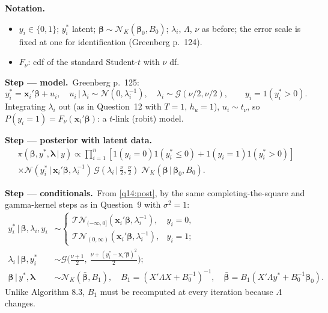 \documentclass[11pt,a4paper]{article}
\numberwithin{equation}{questao}
\newenvironment{notacao}{\par\smallskip\noindent\textbf{Notation.}\begin{itemize}[leftmargin=1.4em,topsep=1pt,itemsep=0pt]\small}{\end{itemize}}
\newcommand{\passo}[2]{\par\smallskip\noindent\textbf{Step --- #1.}~#2}
\newcommand{\TN}{\mathcal{TN}}
\newcommand{\N}{\mathcal{N}}
\newcommand{\Ga}{\mathcal{G}}
\begin{document}
\begin{sol}
\begin{notacao}
\item $y_i\in\{0,1\}$; $y_i^*$ latent; $\boldsymbol\beta\sim\N_K(\boldsymbol\beta_0,B_0)$; $\lambda_i$, $\Lambda$, $\nu$ as before; the error scale is fixed at one for identification (Greenberg p.~124).
\item $F_\nu$: cdf of the standard Student-$t$ with $\nu$ df.
\end{notacao}

\passo{model}{Greenberg p.~125:
\begin{equation}
y_i^*=\mathbf{x}_i'\boldsymbol\beta+u_i,\quad u_i\,|\,\lambda_i\sim\N(0,\lambda_i^{-1}),\quad\lambda_i\sim\Ga(\nu/2,\nu/2),\qquad y_i=1(y_i^*>0). \label{q14:model}
\end{equation}
Integrating $\lambda_i$ out (as in Question~12 with $T=1$, $h_u=1$), $u_i\sim t_\nu$, so $P(y_i=1)=F_\nu(\mathbf{x}_i'\boldsymbol\beta)$: a $t$-link (robit) model.}

\passo{posterior with latent data}{
\begin{multline}
\pi(\boldsymbol\beta,y^*,\boldsymbol\lambda\,|\,y)\propto\prod_{i=1}^n\left[1(y_i=0)1(y_i^*\le0)+1(y_i=1)1(y_i^*>0)\right]\\
\times\N(y_i^*\,|\,\mathbf{x}_i'\boldsymbol\beta,\lambda_i^{-1})\,\Ga(\lambda_i\,|\,\tfrac\nu2,\tfrac\nu2)\;\N_K(\boldsymbol\beta\,|\,\boldsymbol\beta_0,B_0). \label{q14:post}
\end{multline}}

\passo{conditionals}{From \eqref{q14:post}, by the same completing-the-square and gamma-kernel steps as in Question~9 with $\sigma^2=1$:
\begin{align}
y_i^*\,|\,\boldsymbol\beta,\lambda_i,y_i&\sim\begin{cases}\TN_{(-\infty,0]}(\mathbf{x}_i'\boldsymbol\beta,\lambda_i^{-1}), & y_i=0,\\ \TN_{(0,\infty)}(\mathbf{x}_i'\boldsymbol\beta,\lambda_i^{-1}), & y_i=1;\end{cases} \label{q14:ystar}\\
\lambda_i\,|\,\boldsymbol\beta,y_i^*&\sim\Ga\Big(\tfrac{\nu+1}{2},\ \tfrac{\nu+(y_i^*-\mathbf{x}_i'\boldsymbol\beta)^2}{2}\Big); \label{q14:lam}\\
\boldsymbol\beta\,|\,y^*,\boldsymbol\lambda&\sim\N_K(\bar{\boldsymbol\beta},B_1),\quad B_1=(X'\Lambda X+B_0^{-1})^{-1},\quad\bar{\boldsymbol\beta}=B_1(X'\Lambda y^*+B_0^{-1}\boldsymbol\beta_0). \label{q14:beta}
\end{align}
Unlike Algorithm 8.3, $B_1$ must be recomputed at every iteration because $\Lambda$ changes.}


\end{sol}
\end{document}
